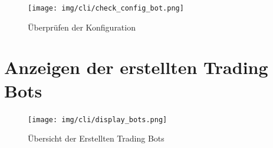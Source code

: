\documentclass[oneside]{ausarbeitung}
\begin{document}
\begin{figure}[H]
  \centering
  \texttt{[image: img/cli/check\_config\_bot.png]}
  \caption{Überprüfen der Konfiguration}
  \label{fig:}
\end{figure}

\section{Anzeigen der erstellten Trading Bots}
\label{sec:anzeigen_der_erstellten_trading_bots}

\begin{figure}[H]
  \centering
  \texttt{[image: img/cli/display\_bots.png]}
  \caption{Übersicht der Erstellten Trading Bots}
  \label{fig:}
\end{figure}

\end{document}
